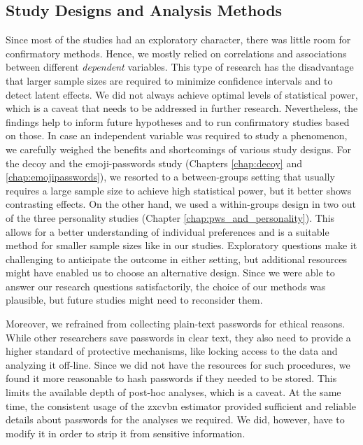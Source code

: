 

\subsection{Study Designs and Analysis Methods}
Since most of the studies had an exploratory character, there was little room for confirmatory methods. Hence, we mostly relied on correlations and associations between different \textit{dependent} variables. This type of research has the disadvantage that larger sample sizes are required to minimize confidence intervals and to  detect latent effects. We did not always achieve optimal levels of statistical power, which is a caveat that needs to be addressed in further research. Nevertheless, the findings help to inform future hypotheses and to run confirmatory studies based on those. 
In case an independent variable was required to study a phenomenon, we carefully weighed the benefits and shortcomings of various study designs. For the decoy and the emoji-passwords study (Chapters \ref{chap:decoy} and \ref{chap:emojipasswords}), we resorted to a between-groups setting that usually requires a large sample size to achieve high statistical power, but it better shows contrasting effects. On the other hand, we used a within-groups design in two out of the three personality studies (Chapter \ref{chap:pws_and_personality}). This allows for a better understanding of individual preferences and is a suitable method for smaller sample sizes like in our studies. Exploratory questions make it challenging to anticipate the outcome in either setting, but additional resources might have enabled us to choose an alternative design. Since we were able to answer our research questions satisfactorily, the choice of our methods was plausible, but future studies might need to reconsider them. 

Moreover, we refrained from collecting plain-text passwords for ethical reasons. While other researchers save passwords in clear text, they also need to provide a higher standard of protective mechanisms, like locking access to the data and analyzing it off-line. Since we did not have the resources for such procedures, we found it more reasonable to hash passwords if they needed to be stored. This limits the available depth of post-hoc analyses, which is a caveat. At the same time, the consistent usage of the zxcvbn estimator provided sufficient and reliable details about passwords for the analyses we required. We did, however, have to modify it in order to strip it from sensitive information. 

